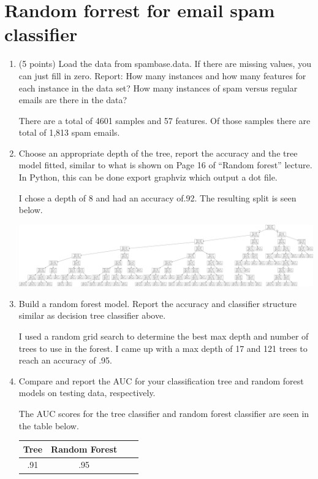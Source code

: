 \documentclass[a4paper]{article}
\begin{document}
\section{Random forrest for email spam classifier}
\begin{enumerate}
\item (5 points) Load the data from spambase.data. If there are missing values, you can just fill in zero. Report: How many instances and how many features for each instance in the data set? How many instances of spam versus regular emails are there in the data?


There are a total of 4601 samples and 57 features.  Of those samples there are total of 1,813 spam emails.  

\item Choose an appropriate depth of the tree, report the accuracy and the tree model fitted, similar to what is shown on Page 16 of “Random forest” lecture. In Python, this can be done export graphviz which output a dot file.

I chose a depth of 8 and had an accuracy of.92.  The resulting split is seen below. 

\includegraphics[width=\textwidth]{tree.png}

\item Build a random forest model.  Report the accuracy and classifier structure similar as decision tree classifier above.

I used a random grid search to determine the best max depth and number of trees to use in the forest.  I came up with a max depth of 17 and 121 trees to reach an accuracy of .95.

\item Compare and report the AUC for your classification tree and random forest models on testing data, respectively.

The AUC scores for the tree classifier and random forest classifier are seen in the table below.

\begin{center}
\begin{tabular}{ |c|c|c|c| } 
\hline
Tree & Random Forest\\
\hline
.91 & .95 \\ 
\hline
\end{tabular}
\end{center}




\end{enumerate}
\end{document}
